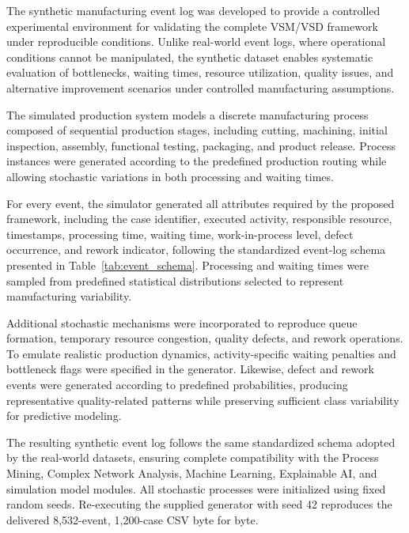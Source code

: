 \documentclass[pdflatex,iicol,Numbered,sn-basic]{sn-jnl}
\begin{document}
The synthetic manufacturing event log was developed to provide a controlled experimental environment for validating the complete VSM/VSD framework under reproducible conditions. Unlike real-world event logs, where operational conditions cannot be manipulated, the synthetic dataset enables systematic evaluation of bottlenecks, waiting times, resource utilization, quality issues, and alternative improvement scenarios under controlled manufacturing assumptions.

The simulated production system models a discrete manufacturing process composed of sequential production stages, including cutting, machining, initial inspection, assembly, functional testing, packaging, and product release. Process instances were generated according to the predefined production routing while allowing stochastic variations in both processing and waiting times.

For every event, the simulator generated all attributes required by the proposed framework, including the case identifier, executed activity, responsible resource, timestamps, processing time, waiting time, work-in-process level, defect occurrence, and rework indicator, following the standardized event-log schema presented in Table~\ref{tab:event_schema}. Processing and waiting times were sampled from predefined statistical distributions selected to represent manufacturing variability.

Additional stochastic mechanisms were incorporated to reproduce queue formation, temporary resource congestion, quality defects, and rework operations. To emulate realistic production dynamics, activity-specific waiting penalties and bottleneck flags were specified in the generator. Likewise, defect and rework events were generated according to predefined probabilities, producing representative quality-related patterns while preserving sufficient class variability for predictive modeling.

The resulting synthetic event log follows the same standardized schema adopted by the real-world datasets, ensuring complete compatibility with the Process Mining, Complex Network Analysis, Machine Learning, Explainable AI, and simulation model modules. All stochastic processes were initialized using fixed random seeds. Re-executing the supplied generator with seed 42 reproduces the delivered 8,532-event, 1,200-case CSV byte for byte.
\end{document}
